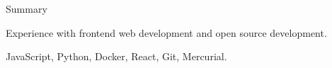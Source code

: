 \documentclass{resume} %
\begin{document}

\begin{rSection}{Summary}
  \begin{rSummarySection}
  {
    \item Experience with frontend web development and open source development.
    \item JavaScript, Python, Docker, React, Git, Mercurial.
  }
  \end{rSummarySection}
\end{rSection}

\end{document}
